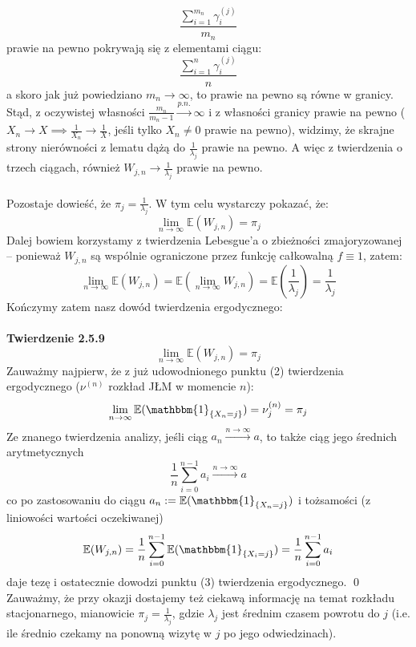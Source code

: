 \documentclass[a4paper]{article}
\begin{document}
$$\frac{\sum\limits_{i=1}^{m_n} \gamma_i^{(j)}}{m_n}$$
prawie na pewno pokrywają się z elementami ciągu:
$$\frac{\sum\limits_{i=1}^{n} \gamma_i^{(j)}}{n}$$
a skoro jak już powiedziano $m_n \to \infty$, to prawie na pewno są równe w granicy.
Stąd, z oczywistej własności $\frac{m_n}{m_n-1} \overset{p.n.}{\to} \infty$ i z własności granicy prawie na pewno ($ X_n \to X \implies \frac{1}{X_n} \to \frac{1}{X}$, jeśli tylko $X_n \neq 0$ prawie na pewno), widzimy, że skrajne strony nierówności z lematu dążą do $\frac{1}{\lambda_j}$ prawie na pewno. A więc z twierdzenia o trzech ciągach, również $W_{j,n} \to \frac{1}{\lambda_j}$ prawie na pewno.\\
\\
Pozostaje dowieść, że $\pi_j = \frac{1}{\lambda_j}$. W tym celu wystarczy pokazać, że:
$$ \lim\limits_{n \to \infty} \mathbb{E}(W_{j,n}) = \pi_j$$ Dalej bowiem korzystamy z twierdzenia Lebesgue'a o zbieżności zmajoryzowanej – ponieważ $W_{j,n}$ są wspólnie ograniczone przez funkcję całkowalną $f \equiv 1$, zatem:
$$\lim\limits_{n \to \infty} \mathbb{E}(W_{j,n}) = \mathbb{E}\left( \lim\limits_{n \to \infty} W_{j,n}\right) = \mathbb{E}\left(\frac{1}{\lambda_j}\right) = \frac{1}{\lambda_j}$$
Kończymy zatem nasz dowód twierdzenia ergodycznego:\\\\
\textbf{Twierdzenie 2.5.9}\\
$$\lim\limits_{n \to \infty} \mathbb{E}(W_{j,n}) = \pi_j$$
Zauważmy najpierw, że z już udowodnionego punktu (2) twierdzenia ergodycznego ($\nu^{(n)}$ rozkład JŁM w momencie $n$):
$$\lim\limits_{n \to \infty} \mathbb{E}(\mathbbm{1}_{\{X_n = j\}}) = \nu^{(n)}_j = \pi_j$$
Ze znanego twierdzenia analizy, jeśli ciąg $a_n \xrightarrow{n \to \infty} a$, to także ciąg jego średnich arytmetycznych $$\frac{1}{n}\sum_{i=0}^{n-1} a_i \xrightarrow{n \to \infty} a$$
co po zastosowaniu do ciągu $a_n := \mathbb{E}(\mathbbm{1}_{\{X_n = j\}})$ i tożsamości (z liniowości wartości oczekiwanej)
$$\mathbb{E}(W_{j,n}) = \frac{1}{n} \sum\limits_{i=0}^{n-1} \mathbb{E}(\mathbbm{1}_{\{X_i = j\}}) = \frac{1}{n} \sum\limits_{i=0}^{n-1} a_i$$
daje tezę i ostatecznie dowodzi punktu (3) twierdzenia ergodycznego. \qed
\\
Zauważmy, że przy okazji dostajemy też ciekawą informację na temat rozkładu stacjonarnego, mianowicie $\pi_j = \frac{1}{\lambda_j}$, gdzie $\lambda_j$ jest średnim czasem powrotu do $j$ (i.e. ile średnio czekamy na ponowną wizytę w $j$ po jego odwiedzinach). 
\\\\
\end{document}
